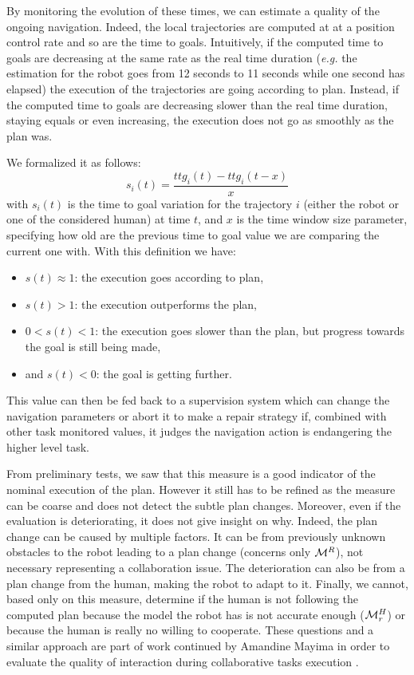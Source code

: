 \documentclass[a4paper,11pt,twoside]{StyleThese}
\begin{document}
By monitoring the evolution of these times, we can estimate a quality of the ongoing navigation. Indeed, the local trajectories are computed at at a position control rate and so are the time to goals. Intuitively, if the computed time to goals are decreasing at the same rate as the real time duration (\textit{e.g.} the estimation for the robot goes from 12 seconds to 11 seconds while one second has elapsed) the execution of the trajectories are going according to plan. Instead, if the computed time to goals are decreasing slower than the real time duration, staying equals or even increasing, the execution does not go as smoothly as the plan was.

We formalized it as follows: 
\begin{equation}
s_i(t) = \frac{ttg_i(t) - ttg_i(t - x)}{x}
\end{equation}
with $s_i(t)$ is the time to goal variation for the trajectory $i$ (either the robot or one of the considered human) at time $t$, and $x$ is the time window size parameter, specifying how old are the previous time to goal value we are comparing the current one with.
With this definition we have:
\begin{itemize}
\item $s(t) \approx 1$: the execution goes according to plan,
\item $s(t) > 1$: the execution outperforms the plan,
\item $0 < s(t) < 1$: the execution goes slower than the plan, but progress towards the goal is still being made,
\item and $s(t) < 0$: the goal is getting further.
\end{itemize}

This value can then be fed back to a supervision system which can change the navigation parameters or abort it to make a repair strategy if, combined with other task monitored values, it judges the navigation action is endangering the higher level task.

From preliminary tests, we saw that this measure is a good indicator of the nominal execution of the plan. However it still has to be refined as the measure can be coarse and does not detect the subtle plan changes. Moreover, even if the evaluation is deteriorating, it does not give insight on why. Indeed, the plan change can be caused by multiple factors. It can be from previously unknown obstacles to the robot leading to a plan change (concerns only $\mathcal{M}^R$), not necessary representing a collaboration issue. The deterioration can also be from a plan change from the human, making the robot to adapt to it. Finally, we cannot, based only on this measure, determine if the human is not following the computed plan because the model the robot has is not accurate enough ($\mathcal{M}^H_r$) or because the human is really no willing to cooperate. These questions and a similar approach are part of work continued by Amandine Mayima in order to evaluate the quality of interaction during collaborative tasks execution \cite{mayima2020toward}.
\end{document}
